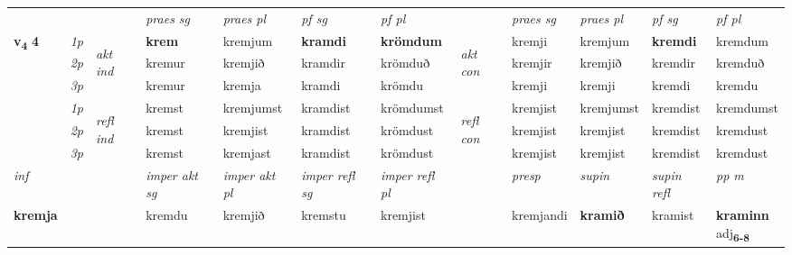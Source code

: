 \begin{longtable}[l]{X>{\footnotesize\itshape}llXXXXlXXXX}
 & &   & \textit{praes sg}  & \textit{praes pl}    & \textit{ pf sg} & \textit{pf pl} & & \textit{praes sg}  & \textit{praes pl}    & \textit{pf sg} & \textit{pf pl }  \\ \cmidrule{4-7} \cmidrule{9-12}
 \multirow{2}{*}{{{\textbf{v{\textsubscript{4}}} \Large{\textbf{4}}}}}  & 1p & \multirow{3}{*}{\begin{turn}{90}\textit{akt ind}\end{turn}} & \textbf{krem} & kremjum & \textbf{kramdi} & \textbf{krömdum} & \multirow{3}{*}{\begin{turn}{90}\textit{akt con}\end{turn}} &kremji & kremjum & \textbf{kremdi} & kremdum\\*
 & 2p &  &  kremur  & kremjið & kramdir & krömduð & & kremjir & kremjið & kremdir & kremduð \\*
 & 3p &  & kremur & kremja & kramdi & krömdu & & kremji & kremji& kremdi & kremdu \\*
\cmidrule{4-7} \cmidrule{9-12}
 & 1p & \multirow{3}{*}{\begin{turn}{90}\textit{refl ind}\end{turn}}  & kremst & kremjumst & kramdist & krömdumst & \multirow{3}{*}{\begin{turn}{90}\textit{refl con}\end{turn}}  &kremjist & kremjumst & kremdist & kremdumst \\*
 & 2p &  & kremst & kremjist & kramdist & krömdust & &kremjist & kremjist & kremdist & kremdust \\*
 & 3p  & & kremst & kremjast & kramdist & krömdust & & kremjist & kremjist& kremdist & kremdust \\*
\cmidrule{4-7} \cmidrule{9-12}

   {\textit{inf}} & &  & \textit{imper akt sg} & \textit{imper akt pl} & \textit{imper refl sg} & \textit{imper refl pl} && \textit{presp} & \textit{supin} & \textit{supin refl} & \textit{pp m} \\*
  {\textbf{kremja}} & && kremdu  & kremjið & kremstu & kremjist && kremjandi &  \textbf{kramið} & kramist & \specialcell{\textbf{kraminn} \\ adj\textbf{\textsubscript{6-8}}} \\*


\end{longtable}
